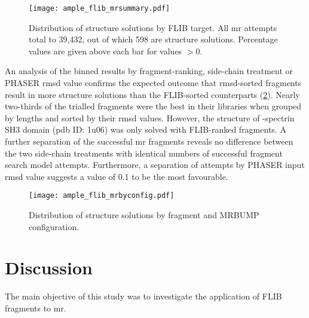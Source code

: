 \begin{figure}[H]
	\centering
	\texttt{[image: ample\_flib\_mrsummary.pdf]}
	\caption[MR structure solutions by FLIB target]{Distribution of structure solutions by FLIB target. All \gls{mr} attempts total to 39,432, out of which 598 are structure solutions. Percentage values are given above each bar for values $>0$.}
	\label{fig:ample_flib_mrsummary}
\end{figure}

An analysis of the binned results by fragment-ranking, side-chain treatment or PHASER \gls{rmsd} value confirms the expected outcome that \gls{rmsd}-sorted fragments result in more structure solutions than the FLIB-sorted counterparts (\cref{fig:ample_flib_mrbyconfig}). Nearly two-thirds of the trialled fragments were the best in their libraries when grouped by lengths and sorted by their \gls{rmsd} values. However, the structure of \textalpha-spectrin SH3 domain (\gls{pdb} ID: 1u06) was only solved with FLIB-ranked fragments. A further separation of the successful \gls{mr} fragments reveals no difference between the two side-chain treatments with identical numbers of successful fragment search model attempts. Furthermore, a separation of attempts by PHASER input \gls{rmsd} value suggests a value of 0.1 to be the most favourable.

\begin{figure}[H]
	\centering
	\texttt{[image: ample\_flib\_mrbyconfig.pdf]}
	\caption[MR structure solutions by input parameters]{Distribution of structure solutions by fragment and MRBUMP configuration.}
	\label{fig:ample_flib_mrbyconfig}
\end{figure}

\section{Discussion}
The main objective of this study was to investigate the application of FLIB fragments to \gls{mr}.
